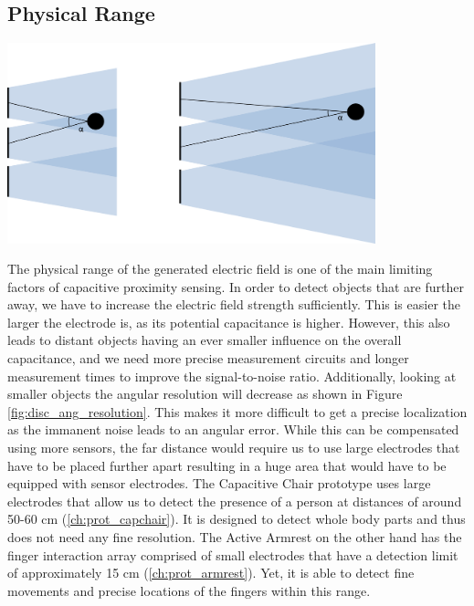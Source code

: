 \subsection{Physical Range}
\begin{minipage}{\linewidth}
\centering
\includegraphics[width=0.8\textwidth]{images/limit_distance}
\label{fig:disc_ang_resolution}
\end{minipage}

The physical range of the generated electric field is one of the main limiting factors of capacitive proximity sensing. In order to detect objects that are further away, we have to increase the electric field strength sufficiently. This is easier the larger the electrode is, as its potential capacitance is higher. However, this also leads to distant objects having an ever smaller influence on the overall capacitance, and we need more precise measurement circuits and longer measurement times to improve the signal-to-noise ratio. Additionally, looking at smaller objects the angular resolution will decrease as shown in Figure \ref{fig:disc_ang_resolution}. This makes it more difficult to get a precise localization as the immanent noise leads to an angular error. While this can be compensated using more sensors, the far distance would require us to use large electrodes that have to be placed further apart resulting in a huge area that would have to be equipped with sensor electrodes. The Capacitive Chair prototype uses large electrodes that allow us to detect the presence of a person at distances of around 50-60 cm (\ref{ch:prot_capchair}). It is designed to detect whole body parts and thus does not need any fine resolution. The Active Armrest on the other hand has the finger interaction array comprised of small electrodes that have a detection limit of approximately 15 cm (\ref{ch:prot_armrest}). Yet, it is able to detect fine movements and precise locations of the fingers within this range.

